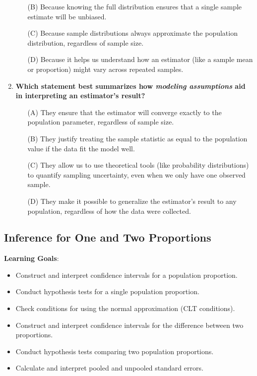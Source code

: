 \documentclass{article}
\begin{document}
\begin{enumerate}
\begin{enumerate}
        \item[(B)] Because knowing the full distribution ensures that a single sample estimate will be unbiased.
        \item[(C)] Because sample distributions always approximate the population distribution, regardless of sample size.
        \item[(D)] Because it helps us understand how an estimator (like a sample mean or proportion) might vary across repeated samples.
        \end{enumerate}
    \item  \textbf{Which statement best summarizes how \emph{modeling assumptions} aid in interpreting an estimator's result?}
        \begin{enumerate}
        \item[(A)] They ensure that the estimator will converge exactly to the population parameter, regardless of sample size.
        \item[(B)] They justify treating the sample statistic as equal to the population value if the data fit the model well.
        \item[(C)] They allow us to use theoretical tools (like probability distributions) to quantify sampling uncertainty, even when we only have one observed sample.
        \item[(D)] They make it possible to generalize the estimator’s result to any population, regardless of how the data were collected.
        \end{enumerate}
\end{enumerate}

\subsection{Inference for One and Two Proportions}
\textbf{Learning Goals}:
\begin{itemize}
    \item Construct and interpret confidence intervals for a population proportion.
    \item Conduct hypothesis tests for a single population proportion.
    \item Check conditions for using the normal approximation (CLT conditions).
    \item Construct and interpret confidence intervals for the difference between two proportions.
    \item Conduct hypothesis tests comparing two population proportions.
    \item Calculate and interpret pooled and unpooled standard errors.
\end{itemize}
\end{document}

